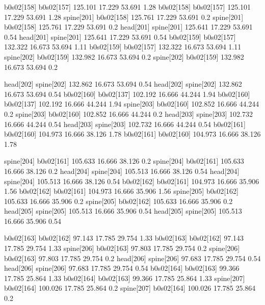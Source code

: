 b0s02[158]    b0s02[157]    125.101    17.229    53.691    1.28
b0s02[158]    b0s02[157]    125.101    17.229    53.691    1.28
spine[201]    b0s02[158]    125.761    17.229    53.691    0.2
spine[201]    b0s02[158]    125.761    17.229    53.691    0.2
head[201]    spine[201]    125.641    17.229    53.691    0.54
head[201]    spine[201]    125.641    17.229    53.691    0.54
b0s02[159]    b0s02[157]    132.322    16.673    53.694    1.11
b0s02[159]    b0s02[157]    132.322    16.673    53.694    1.11
spine[202]    b0s02[159]    132.982    16.673    53.694    0.2
spine[202]    b0s02[159]    132.982    16.673    53.694    0.2


head[202]    spine[202]    132.862    16.673    53.694    0.54
head[202]    spine[202]    132.862    16.673    53.694    0.54
b0s02[160]    b0s02[137]    102.192    16.666    44.244    1.94
b0s02[160]    b0s02[137]    102.192    16.666    44.244    1.94
spine[203]    b0s02[160]    102.852    16.666    44.244    0.2
spine[203]    b0s02[160]    102.852    16.666    44.244    0.2
head[203]    spine[203]    102.732    16.666    44.244    0.54
head[203]    spine[203]    102.732    16.666    44.244    0.54
b0s02[161]    b0s02[160]    104.973    16.666    38.126    1.78
b0s02[161]    b0s02[160]    104.973    16.666    38.126    1.78


spine[204]    b0s02[161]    105.633    16.666    38.126    0.2
spine[204]    b0s02[161]    105.633    16.666    38.126    0.2
head[204]    spine[204]    105.513    16.666    38.126    0.54
head[204]    spine[204]    105.513    16.666    38.126    0.54
b0s02[162]    b0s02[161]    104.973    16.666    35.906    1.56
b0s02[162]    b0s02[161]    104.973    16.666    35.906    1.56
spine[205]    b0s02[162]    105.633    16.666    35.906    0.2
spine[205]    b0s02[162]    105.633    16.666    35.906    0.2
head[205]    spine[205]    105.513    16.666    35.906    0.54
head[205]    spine[205]    105.513    16.666    35.906    0.54


b0s02[163]    b0s02[162]    97.143    17.785    29.754    1.33
b0s02[163]    b0s02[162]    97.143    17.785    29.754    1.33
spine[206]    b0s02[163]    97.803    17.785    29.754    0.2
spine[206]    b0s02[163]    97.803    17.785    29.754    0.2
head[206]    spine[206]    97.683    17.785    29.754    0.54
head[206]    spine[206]    97.683    17.785    29.754    0.54
b0s02[164]    b0s02[163]    99.366    17.785    25.864    1.33
b0s02[164]    b0s02[163]    99.366    17.785    25.864    1.33
spine[207]    b0s02[164]    100.026    17.785    25.864    0.2
spine[207]    b0s02[164]    100.026    17.785    25.864    0.2


